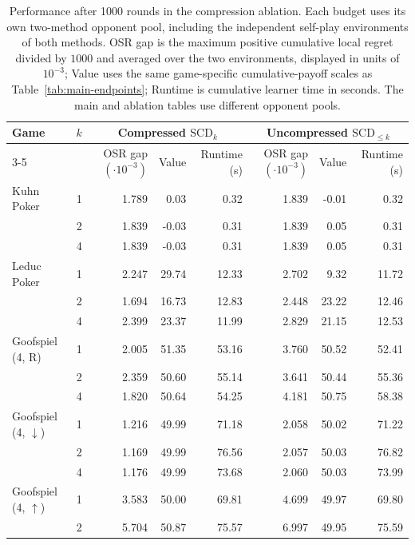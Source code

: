 \begin{table}[t]
\centering
\caption{Performance after 1000 rounds in the compression ablation. Each budget uses its own two-method opponent pool, including the independent self-play environments of both methods. OSR gap is the maximum positive cumulative local regret divided by \(1000\) and averaged over the two environments, displayed in units of \(10^{-3}\); Value uses the same game-specific cumulative-payoff scales as Table~\ref{tab:main-endpoints}; Runtime is cumulative learner time in seconds. The main and ablation tables use different opponent pools.}
\label{tab:ablation-endpoints}
\fontsize{8.5}{11}\selectfont
\renewcommand{\arraystretch}{1.08}
\setlength{\tabcolsep}{3pt}
\begin{tabular*}{\textwidth}{@{\extracolsep{\fill}}lcrrrrrr@{}}
\hline
Game & \(k\) & \multicolumn{3}{c}{Compressed \(\mathrm{SCD}_k\)} & \multicolumn{3}{c}{Uncompressed \(\mathrm{SCD}_{\le k}\)}\\
\cline{3-5}\cline{6-8}
 & & OSR gap \((\cdot10^{-3})\) & Value & Runtime (s) & OSR gap \((\cdot10^{-3})\) & Value & Runtime (s)\\
\hline
Kuhn Poker & 1 & 1.789 & 0.03 & 0.32 & 1.839 & -0.01 & 0.32\\
 & 2 & 1.839 & -0.03 & 0.31 & 1.839 & 0.05 & 0.31\\
 & 4 & 1.839 & -0.03 & 0.31 & 1.839 & 0.05 & 0.31\\
\hline
Leduc Poker & 1 & 2.247 & 29.74 & 12.33 & 2.702 & 9.32 & 11.72\\
 & 2 & 1.694 & 16.73 & 12.83 & 2.448 & 23.22 & 12.46\\
 & 4 & 2.399 & 23.37 & 11.99 & 2.829 & 21.15 & 12.53\\
\hline
Goofspiel (4, R) & 1 & 2.005 & 51.35 & 53.16 & 3.760 & 50.52 & 52.41\\
 & 2 & 2.359 & 50.60 & 55.14 & 3.641 & 50.44 & 55.36\\
 & 4 & 1.820 & 50.64 & 54.25 & 4.181 & 50.75 & 58.38\\
\hline
Goofspiel (4, $\downarrow$) & 1 & 1.216 & 49.99 & 71.18 & 2.058 & 50.02 & 71.22\\
 & 2 & 1.169 & 49.99 & 76.56 & 2.057 & 50.03 & 76.82\\
 & 4 & 1.176 & 49.99 & 73.68 & 2.060 & 50.03 & 73.99\\
\hline
Goofspiel (4, $\uparrow$) & 1 & 3.583 & 50.00 & 69.81 & 4.699 & 49.97 & 69.80\\
 & 2 & 5.704 & 50.87 & 75.57 & 6.997 & 49.95 & 75.59\\

\end{tabular*}
\end{table}
